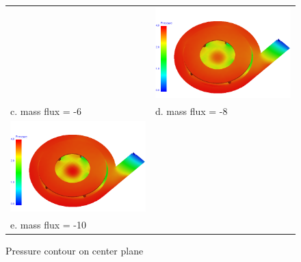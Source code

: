 \documentclass[letterpaper,12pt]{article}
\begin{document}
\begin{figure}[!h!tbp]
\begin{center}
\begin{tabular}{ p{7cm} p{7cm} }
 & \includegraphics[scale=0.263157894737]{./Figures/Image_5.png}
 \\ c. mass flux = -6 & d. mass flux = -8 \\
\includegraphics[scale=0.263157894737]{./Figures/Image_6.png}
 &  \\ e. mass flux = -10 &  \\
\end{tabular}
\caption{\label{fig:pres}
Pressure contour on center plane}
\end{center}
\end{figure}
\vfill
\newpage
\clearpage
\end{document}
